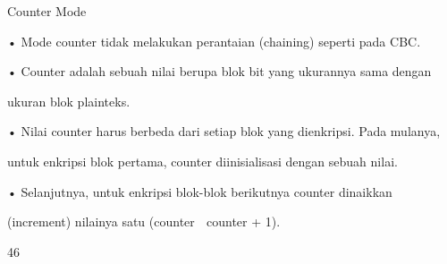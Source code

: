 \documentclass{article}
\begin{document}

Counter Mode

• Mode counter tidak melakukan perantaian (chaining) seperti pada CBC. 

• Counter adalah sebuah nilai berupa blok bit yang ukurannya sama dengan 

ukuran blok plainteks. 

• Nilai counter harus berbeda dari setiap blok yang dienkripsi. Pada mulanya, 

untuk enkripsi blok pertama, counter diinisialisasi dengan sebuah nilai. 

• Selanjutnya, untuk enkripsi blok-blok berikutnya counter dinaikkan 

(increment) nilainya satu  (counter  counter + 1). 

46
\end{document}
